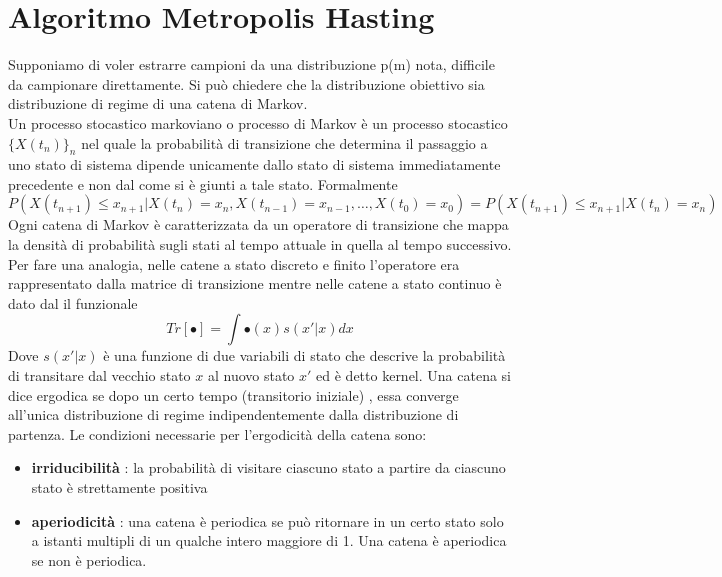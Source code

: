 \chapter{Algoritmo Metropolis Hasting}
Supponiamo di voler estrarre campioni da una distribuzione p(m) nota, difficile da
campionare direttamente.
Si può  chiedere che la distribuzione obiettivo sia
distribuzione di regime di una catena di Markov.\\ 
Un processo stocastico markoviano o processo di Markov è un processo stocastico $\{X(t_n)\}_n$ nel quale la probabilità di transizione che determina il passaggio a uno stato di sistema dipende unicamente dallo stato di sistema immediatamente precedente e non dal come si è giunti a tale stato. Formalmente
\begin{equation}
P(X(t_{n+1})\leq x_{n+1}|X(t_n)= x_n, X(t_{n-1})= x_{n-1}, \ldots, X(t_0)= x_0) = P(X(t_{n+1})\leq x_{n+1}|X(t_n)=x_n)
\end{equation}
Ogni catena di Markov è caratterizzata da un operatore di transizione che mappa la densità di probabilità sugli stati al tempo attuale in quella al tempo successivo. Per fare una analogia, nelle catene a stato discreto e finito l'operatore era  rappresentato dalla matrice di transizione mentre nelle catene a stato continuo è dato dal il funzionale
\begin{equation}
Tr[\bullet]=\int \bullet(x)s(x'|x)dx
\end{equation}
Dove $s(x'|x)$ è una funzione di due variabili di stato che descrive la probabilità di transitare dal vecchio stato $x$ al nuovo stato $x'$ ed è detto kernel.
 Una catena si dice ergodica se
dopo un certo tempo (transitorio iniziale) , essa converge all'unica distribuzione
di regime indipendentemente dalla distribuzione di partenza.
Le condizioni necessarie per l’ergodicità   della catena sono:
\begin{itemize}
\item \textbf{irriducibilità} : la probabilità   di visitare ciascuno stato a partire da ciascuno
stato è   strettamente positiva
\item \textbf{aperiodicità} : una catena è periodica se può  ritornare in un certo stato solo
a istanti multipli di un qualche intero maggiore di 1. Una catena è   aperiodica
se non è   periodica.
\end{itemize}

